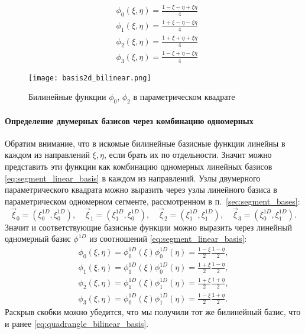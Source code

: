 \begin{equation}
\label{eq:quadrangle_bilinear_basis}
\begin{aligned}
&\phi_0(\xi, \eta) = \frac{1-\xi-\eta+\xi\eta}{4}\\[10pt]
&\phi_1(\xi, \eta) = \frac{1+\xi-\eta-\xi\eta}{4}\\[10pt]
&\phi_2(\xi, \eta) = \frac{1+\xi+\eta+\xi\eta}{4}\\[10pt]
&\phi_3(\xi, \eta) = \frac{1-\xi+\eta-\xi\eta}{4}
\end{aligned}
\end{equation}

\begin{figure}[h!]
\centering
\texttt{[image: basis2d\_bilinear.png]}
\caption{Билинейные функции $\phi_0$, $\phi_2$ в параметрическом квадрате}
\label{fig:basis2d_bilinear}
\end{figure}

\paragraph{Определение двумерных базисов через комбинацию одномерных}
Обратим внимание, что в искомые билинейные базисные функции линейны
в каждом из направлений $\xi, \eta$, если брать их по отдельности.
Значит можно представить эти функции как комбинацию одномерных
линейных базисов \cref{eq:segment_linear_basis} в каждом из направлений.
Узлы двумерного параметрического квадрата можно
выразить через узлы линейного базиса в параметрическом одномерном сегменте,
рассмотренном в п.~\ref{sec:segment_bases}:
$$
\vec \xi_0 = \left(\xi^{1D}_0, \xi^{1D}_0\right), \quad
\vec \xi_1 = \left(\xi^{1D}_1, \xi^{1D}_0\right), \quad
\vec \xi_2 = \left(\xi^{1D}_1, \xi^{1D}_1\right), \quad
\vec \xi_3 = \left(\xi^{1D}_0, \xi^{1D}_1\right).
$$
Значит и соответствующие базисные функции можно выразить
через линейный одномерный базис $\phi^{1D}$ из соотношений \cref{eq:segment_linear_basis}:
\begin{equation*}
\begin{aligned}
\phi_0(\xi, \eta) = \phi_0^{1D}(\xi)\phi^{1D}_0(\eta) = \frac{1-\xi}{2}\frac{1-\eta}{2},\\[5pt]
\phi_1(\xi, \eta) = \phi_1^{1D}(\xi)\phi^{1D}_0(\eta) = \frac{1+\xi}{2}\frac{1-\eta}{2},\\[5pt]
\phi_2(\xi, \eta) = \phi_1^{1D}(\xi)\phi^{1D}_1(\eta) = \frac{1+\xi}{2}\frac{1+\eta}{2},\\[5pt]
\phi_3(\xi, \eta) = \phi_0^{1D}(\xi)\phi^{1D}_1(\eta) = \frac{1-\xi}{2}\frac{1+\eta}{2}.
\end{aligned}
\end{equation*}
Раскрыв скобки можно убедится, что мы получили тот же билинейный базис, что и ранее \cref{eq:quadrangle_bilinear_basis}.

